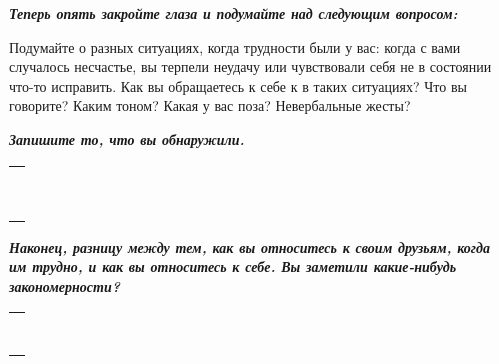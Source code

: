 \newpage


\textbf{\textit{Теперь опять закройте глаза и подумайте над следующим вопросом:}}

Подумайте о разных ситуациях, когда трудности были у вас: когда с вами случалось несчастье, вы терпели неудачу или чувствовали себя не в состоянии что-то исправить. Как вы обращаетесь к себе к в таких ситуациях? Что вы говорите? Каким тоном? Какая у вас поза? Невербальные жесты?

\vspace{2ex}

\textbf{\textit{Запишите то, что вы обнаружили.}}

\setlength{\extrarowheight}{2mm}
\begin{tabularx}{\textwidth}{X}
	\\
	\arrayrulecolor{gray}\hline\\
	\hline\\
	\hline\\
	\hline\\
	\hline\\
	\hline\\
	\hline\\	
	\hline\\
	\hline\\
	\hline\\
\end{tabularx}
\setlength{\extrarowheight}{0mm}

\textbf{\textit{Наконец, разницу между тем, как вы относитесь к своим друзьям, когда им трудно, и как вы относитесь к себе. Вы заметили какие-нибудь закономерности?}}

\setlength{\extrarowheight}{2mm}
\begin{tabularx}{\textwidth}{X}
	\\
	\arrayrulecolor{gray}\hline\\
	\hline\\
	\hline\\
	\hline\\
	\hline\\
	\hline\\
	\hline\\	
	\hline\\
\end{tabularx}
\setlength{\extrarowheight}{0mm}


\newpage



\vspace{3ex}

